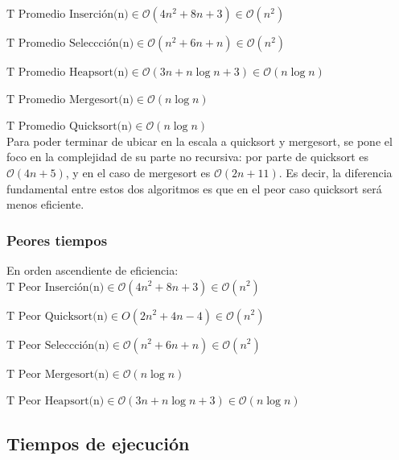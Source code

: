 \documentclass[article,a4paper]{article}
\newcommand{\bigO}{\mathcal{O}}
\begin{document}
$\mbox{T Promedio Inserción(n)} \in \bigO(4n^2 + 8n + 3) \in \bigO(n^2)$

$\mbox{T Promedio Seleccción(n)} \in \bigO(n^2 + 6n + n) \in \bigO(n^2)$

$\mbox{T Promedio Heapsort(n)} \in \bigO(3n + n \log n + 3) \in \bigO(n \log n)$

$\mbox{T Promedio Mergesort(n)} \in \bigO(n \log n)$

$\mbox{T Promedio Quicksort(n)} \in \bigO(n \log n)$\\

Para poder terminar de ubicar en la escala a quicksort y mergesort, se pone el foco en la complejidad de su parte no recursiva: por parte de quicksort es $\bigO(4n + 5)$, y en el caso de mergesort es $\bigO(2n + 11)$. Es decir, la diferencia fundamental entre estos dos algoritmos es que en el peor caso quicksort será menos eficiente.

\subsubsection{Peores tiempos}

En orden ascendiente de eficiencia:\\

$\mbox{T Peor Inserción(n)} \in \bigO(4n^2 + 8n + 3) \in \bigO(n^2)$

$\mbox{T Peor Quicksort(n)} \in O(2 n ^2 + 4n - 4) \in \bigO(n^2)$

$\mbox{T Peor Seleccción(n)} \in \bigO(n^2 + 6n + n) \in \bigO(n^2)$

$\mbox{T Peor Mergesort(n)} \in \bigO(n \log n) $

$\mbox{T Peor Heapsort(n)} \in \bigO(3n + n \log n + 3) \in \bigO(n \log n)$

\subsection{Tiempos de ejecución}

\end{document}
